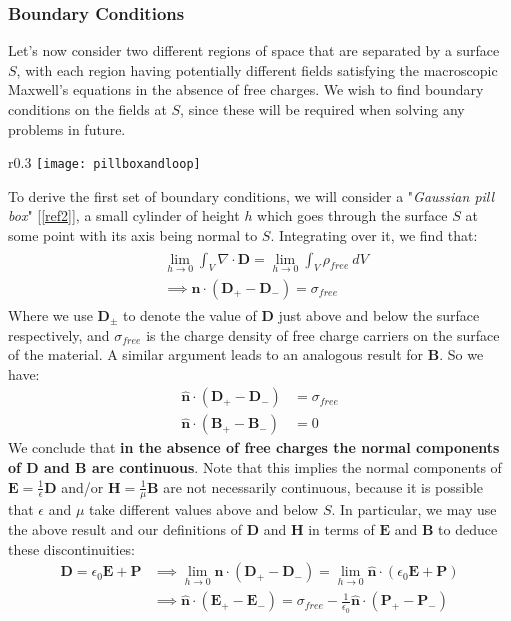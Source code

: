 \documentclass[a4paper]{article}
\numberwithin{equation}{section}
\begin{document}
\subsubsection{Boundary Conditions}
Let's now consider two different regions of space that are separated by a surface $S$, with each region having potentially different fields satisfying the macroscopic Maxwell's equations in the absence of free charges. We wish to find boundary conditions on the fields at $S$, since these will be required when solving any problems in future.\\
\begin{wrapfigure}[16]{r}{0.3\textwidth}
	\texttt{[image: pillboxandloop]}
\end{wrapfigure}
To derive the first set of boundary conditions, we will consider a "\textit{Gaussian pill box}" [\ref{ref2}], a small cylinder of height $h$ which goes through the surface $S$ at some point with its axis being normal to $S$. Integrating over it, we find that:
\begin{align*}
\begin{split}
&\lim_{h \rightarrow 0} \int_V \nabla \cdot \mathbf{D} = \lim_{h \rightarrow 0} \int_V \rho_{free} \ dV \\
&\implies \hat{\mathbf{n}} \cdot (\mathbf{D}_+ - \mathbf{D}_-) = \sigma_{free}
\end{split}
\end{align*}
Where we use $\mathbf{D}_\pm$ to denote the value of $\mathbf{D}$ just above and below the surface respectively, and $\sigma_{free}$ is the charge density of free charge carriers on the surface of the material. A similar argument leads to an analogous result for $\mathbf{B}$. So we have:
\begin{align}
\hat{\mathbf{n}} \cdot (\mathbf{D}_+ - \mathbf{D}_-) &= \sigma_{free} \\
\hat{\mathbf{n}} \cdot (\mathbf{B}_+ - \mathbf{B}_-) &= 0
\end{align}
We conclude that \textbf{in the absence of free charges the normal components of D and B are continuous}. Note that this implies the normal components of $\mathbf{E}= \frac{1}{\epsilon}\mathbf{D}$ and/or $\mathbf{H}=\frac{1}{\mu} \mathbf{B}$ are not necessarily continuous, because it is possible that $\epsilon$ and $\mu$ take different values above and below $S$. In particular, we may use the above result and our definitions of $\mathbf{D}$ and $\mathbf{H}$ in terms of $\mathbf{E}$ and $\mathbf{B}$ to deduce these discontinuities:
\begin{align*}
\mathbf{D} = \epsilon_0\mathbf{E} + \mathbf{P} &\implies \lim_{h \rightarrow 0} \hat{\mathbf{n}} \cdot (\mathbf{D}_+ - \mathbf{D}_-) = \lim_{h \rightarrow 0} \hat{\mathbf{n}} \cdot (\epsilon_0 \mathbf{E} +\mathbf P) \\
& \implies \hat{\mathbf{n}} \cdot (\mathbf{E}_+-\mathbf{E}_-) = \sigma_{free} -\frac{1}{\epsilon_0} \hat{\mathbf{n}} \cdot (\mathbf{P}_+ - \mathbf{P}_-)
\end{align*}
\end{document}
